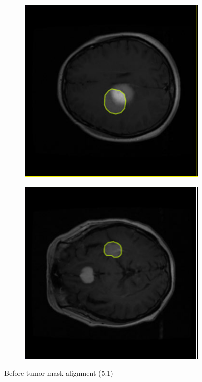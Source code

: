 \documentclass[a4paper,12pt]{extarticle}
\begin{document}
\begin{figure}[H]
\begin{subfigure}[b]{0.2\textwidth}
    \end{subfigure}
    \begin{subfigure}[b]{0.2\textwidth}
        \centering
        \includegraphics[width=\textwidth]{figure/3.png}
    \end{subfigure}
    \begin{subfigure}[b]{0.2\textwidth}
        \centering
        \includegraphics[width=\textwidth]{figure/4.png}
    \end{subfigure}
    \caption{Before tumor mask alignment (5.1)}
    \label{fig:before_alignment}
\end{figure}
\end{document}
